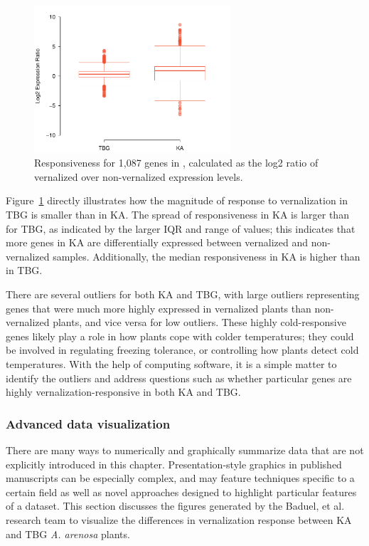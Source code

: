 \begin{figure}[h]
	\centering
	\includegraphics[width=0.65\textwidth]{ch_intro_to_data_oi_biostat/figures/arenosaResponseBoxplot/arenosaResponseBoxplot}
	\caption{Responsiveness for 1,087 genes in , calculated as the log2 ratio of vernalized over non-vernalized expression levels.}
	\label{arenosaResponseBoxplot}
\end{figure}

Figure~\ref{arenosaResponseBoxplot} directly illustrates how the magnitude of response to vernalization in TBG is smaller than in KA. The spread of responsiveness in KA is larger than for TBG, as indicated by the larger IQR and range of values; this indicates that more genes in KA are differentially expressed between vernalized and non-vernalized samples. Additionally, the median responsiveness in KA is higher than in TBG.

There are several outliers for both KA and TBG, with large outliers representing genes that were much more highly expressed in vernalized plants than non-vernalized plants, and vice versa for low outliers. These highly cold-responsive genes likely play a role in how plants cope with colder temperatures; they could be involved in regulating freezing tolerance, or controlling how plants detect cold temperatures. With the help of computing software, it is a simple matter to identify the outliers and address questions such as whether particular genes are highly vernalization-responsive in both KA and TBG.

\subsubsection{Advanced data visualization}

There are many ways to numerically and graphically summarize data that are not explicitly introduced in this chapter. Presentation-style graphics in published manuscripts can be especially complex, and may feature techniques specific to a certain field as well as novel approaches designed to highlight particular features of a dataset. This section discusses the figures generated by the Baduel, et al. research team to visualize the differences in vernalization response between KA and TBG \textit{A. arenosa} plants.

